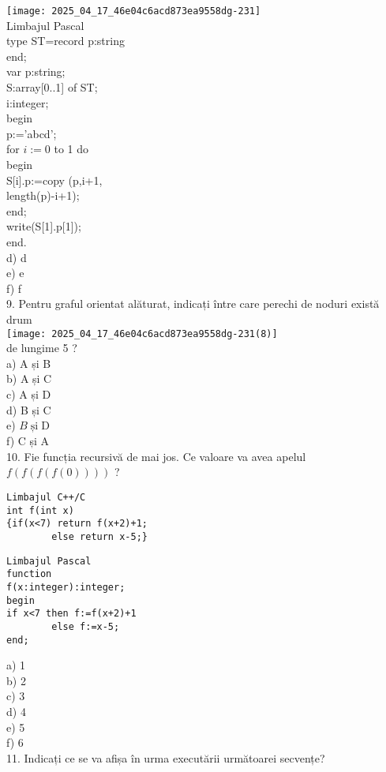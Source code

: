 \texttt{[image: 2025\_04\_17\_46e04c6acd873ea9558dg-231]}\\
Limbajul Pascal\\
type ST=record p:string\\
end;\\
var p:string;\\[0pt]
S:array[0..1] of ST;\\
i:integer;\\
begin\\
p:='abcd';\\
for $i:=0$ to 1 do\\
begin\\[0pt]
S[i].p:=copy (p,i+1,\\
length(p)-i+1);\\
end;\\[0pt]
write(S[1].p[1]);\\
end.\\
d) d\\
e) e\\
f) f\\
9. Pentru graful orientat alăturat, indicați între care perechi de noduri există drum\\
\texttt{[image: 2025\_04\_17\_46e04c6acd873ea9558dg-231(8)]}\\
de lungime 5 ?\\
a) A și B\\
b) A și C\\
c) A și D\\
d) B și C\\
e) $B \operatorname{și} \mathrm{D}$\\
f) C și A\\
10. Fie funcția recursivă de mai jos. Ce valoare va avea apelul $f(f(f(f(0))))$ ?

\begin{verbatim}
Limbajul C++/C
int f(int x)
{if(x<7) return f(x+2)+1;
        else return x-5;}
\end{verbatim}

\begin{verbatim}
Limbajul Pascal
function
f(x:integer):integer;
begin
if x<7 then f:=f(x+2)+1
        else f:=x-5;
end;
\end{verbatim}

a) 1\\
b) 2\\
c) 3\\
d) 4\\
e) 5\\
f) 6\\
11. Indicați ce se va afișa în urma executării următoarei secvențe?

